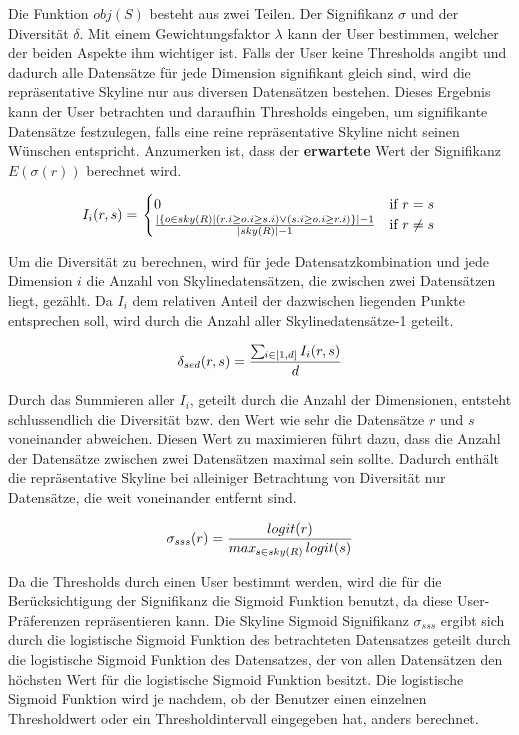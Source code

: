 Die Funktion $obj(S)$ besteht aus zwei Teilen. Der Signifikanz $\sigma$ und der Diversität $\delta$.
Mit einem Gewichtungsfaktor $\lambda$ kann der User bestimmen, welcher der beiden Aspekte ihm wichtiger ist. 
Falls der User keine Thresholds angibt und dadurch alle Datensätze für jede Dimension signifikant gleich sind, wird die repräsentative Skyline nur aus diversen Datensätzen bestehen. Dieses Ergebnis kann der User betrachten und daraufhin Thresholds eingeben, um signifikante Datensätze festzulegen, falls eine reine repräsentative Skyline nicht seinen Wünschen entspricht.  Anzumerken ist, dass der \textbf{erwartete} Wert der Signifikanz $E(\sigma(r))$ berechnet wird. 

$$\begin{displaystyle}
  I_i(r, s) = \left.
  \begin{cases}
    0 & \text{if } r=s \\
    \frac{|\{o \in{sky(R)}| (r.i \geq o.i \geq s.i) \lor (s.i \geq o.i \geq r.i)\}|-1}{|sky(R)|-1} & \text{if } r \neq s
  \end{cases}
  \right.
\end{displaystyle}$$

Um die Diversität zu berechnen, wird für jede Datensatzkombination und jede Dimension $i$ die Anzahl von Skylinedatensätzen, die zwischen zwei Datensätzen liegt, gezählt. Da $I_i$ dem relativen Anteil der dazwischen liegenden Punkte entsprechen soll, wird durch die Anzahl aller Skylinedatensätze-1 geteilt.

$$\delta_{sed}(r,s)=\frac{\sum\limits\mathop{}_{\mkern-5mu i \in{[1,d]}} I_i(r,s)}{d}$$

Durch das Summieren aller $I_i$, geteilt durch die Anzahl der Dimensionen, entsteht schlussendlich die Diversität bzw. den Wert wie sehr die Datensätze $r$ und $s$ voneinander abweichen. Diesen Wert zu maximieren führt dazu, dass die Anzahl der Datensätze zwischen zwei Datensätzen maximal sein sollte. Dadurch enthält die repräsentative Skyline bei alleiniger Betrachtung von Diversität nur Datensätze, die weit voneinander entfernt sind. 

$$\sigma_{sss}(r)=\frac{logit(r)}{max\mathop{}_{\mkern-5mu s \in{sky(R)}}logit(s)}$$

Da die Thresholds durch einen User bestimmt werden, wird die für die Berücksichtigung der Signifikanz die Sigmoid Funktion benutzt, da diese User-Präferenzen repräsentieren kann. Die Skyline Sigmoid Signifikanz $\sigma_{sss}$ ergibt sich durch die logistische Sigmoid Funktion des betrachteten Datensatzes geteilt durch die logistische Sigmoid Funktion des Datensatzes, der von allen Datensätzen den höchsten Wert für die logistische Sigmoid Funktion besitzt. Die logistische Sigmoid Funktion wird je nachdem, ob der Benutzer einen einzelnen Thresholdwert oder ein Thresholdintervall eingegeben hat, anders berechnet.

